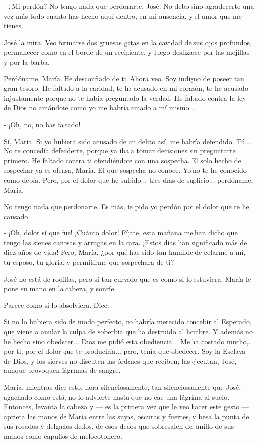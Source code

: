 \documentclass[12pt]{book} %
\begin{document}
- ¿Mi perdón? No tengo nada que perdonarte, José. No debo sino agradecerte una vez más todo cuanto has hecho aquí dentro, en mi ausencia, y el amor que me tienes. 

José la mira. Veo formarse dos gruesas gotas en la cavidad de sus ojos profundos, permanecer como en el borde de un recipiente, y luego deslizarse por las mejillas y por la barba. 

Perdóname, María. He desconfiado de ti. Ahora veo. Soy indigno de poseer tan gran tesoro. He faltado a la caridad, te he acusado en mi corazón, te he acusado injustamente porque no te había preguntado la verdad. He faltado contra la ley de Dios no amándote como yo me habría amado a mí mismo... 

- ¡Oh, no, no has faltado! 

Sí, María. Si yo hubiera sido acusado de un delito así, me habría defendido. Tú... No te concedía defenderte, porque ya iba a tomar decisiones sin preguntarte primero. He faltado contra ti ofendiéndote con una sospecha. El solo hecho de sospechar ya es ofensa, María. El que sospecha no conoce. Yo no te he conocido como debía. Pero, por el dolor que he sufrido... tres días de suplicio... perdóname, María. 

No tengo nada que perdonarte. Es más, te pido yo perdón por el dolor que te he causado. 

- ¡Oh, dolor sí que fue! ¡Cuánto dolor! Fíjate, esta mañana me han dicho que tengo las sienes canosas y arrugas en la cara. ¡Estos días han significado más de diez años de vida! Pero, María, ¿por qué has sido tan humilde de celarme a mí, tu esposo, tu gloria, y permitirme que sospechara de ti? 

José no está de rodillas, pero sí tan curvado que es como si lo estuviera. María le pone su mano en la cabeza, y sonríe. 

Parece como si lo absolviera. Dice: 

Si no lo hubiera sido de modo perfecto, no habría merecido concebir al Esperado, que viene a anular la culpa de soberbia que ha destruido al hombre. Y además no he hecho sino obedecer... Dios me pidió esta obediencia... Me ha costado mucho,. por ti, por el dolor que te produciría... pero, tenía que obedecer. Soy la Esclava de Dios, y los siervos no discuten las órdenes que reciben; las ejecutan, José, aunque provoquen lágrimas de sangre. 

María, mientras dice esto, llora silenciosamente, tan silenciosamente que José, agachado como está, no lo advierte hasta que no cae una lágrima al suelo. Entonces, levanta la cabeza y — es la primera vez que le veo hacer este gesto — aprieta las manos de María entre las suyas, oscuras y fuertes, y besa la punta de sus rosados y delgados dedos, de esos dedos que sobresalen del anillo de sus manos como capullos de melocotonero. 
\end{document}
